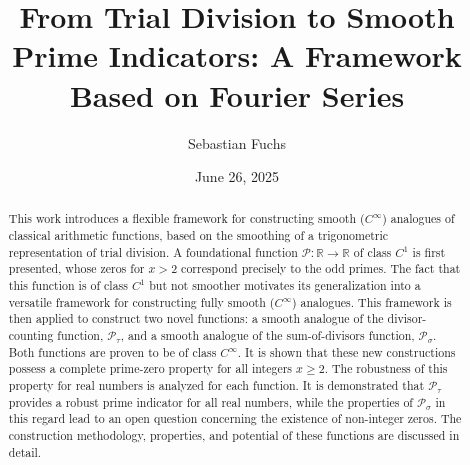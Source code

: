 \documentclass[11pt,a4paper]{amsart}
\title[From Trial Division to Smooth Prime Indicators]{From Trial Division to Smooth Prime Indicators: A Framework Based on Fourier Series}
\author{Sebastian Fuchs \orcidlink{0009-0009-1237-4804}}
\date{June 26, 2025}
\newcommand{\Px}{\mathcal{P}}
\newcommand{\R}{\mathbb{R}}
\theoremstyle{plain}
\theoremstyle{definition}
\begin{document}
\begin{abstract}
This work introduces a flexible framework for constructing smooth ($C^\infty$) analogues of classical arithmetic functions, based on the smoothing of a trigonometric representation of trial division.
A foundational function $\Px\colon\R\to\R$ of class $C^1$ is first presented, whose zeros for $x>2$ correspond precisely to the odd primes.
The fact that this function is of class $C^1$ but not smoother motivates its generalization into a versatile framework for constructing fully smooth ($C^\infty$) analogues.
This framework is then applied to construct two novel functions: a smooth analogue of the divisor-counting function, $\Px_{\tau}$, and a smooth analogue of the sum-of-divisors function, $\Px_{\sigma}$.
Both functions are proven to be of class $C^\infty$. It is shown that these new constructions possess a complete prime-zero property for all integers $x \ge 2$.
The robustness of this property for real numbers is analyzed for each function.
It is demonstrated that $\Px_{\tau}$ provides a robust prime indicator for all real numbers, while the properties of $\Px_{\sigma}$ in this regard lead to an open question concerning the existence of non-integer zeros.
The construction methodology, properties, and potential of these functions are discussed in detail.
\end{abstract}

\maketitle

\end{document}
